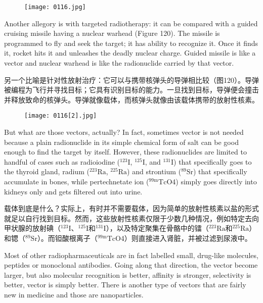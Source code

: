 \documentclass[dvipsnames, svgnames,a4paper,11pt]{article}
\begin{document}
\begin{figure}[h]
    \centering
    \texttt{[image: 0116.jpg]}
     \label{fig119}
\end{figure}


Another allegory is with targeted radiotherapy: it can be compared with a guided
cruising missile having a nuclear warhead (Figure 120). The missile is programmed
to fly and seek the target; it has ability to recognize it. Once it finds it, rocket hits it
and unleashes the deadly nuclear charge. Guided missile is like a vector and nuclear
warhead is like the radionuclide carried by that vector.

另一个比喻是针对性放射治疗：它可以与携带核弹头的导弹相比较（图120）。导弹被编程为飞行并寻找目标；它具有识别目标的能力。一旦找到目标，导弹便会撞击并释放致命的核弹头。导弹就像载体，而核弹头就像由该载体携带的放射性核素。

\begin{figure}[h]
    \centering
    \texttt{[image: 0116[2].jpg]}
     \label{fig120}
\end{figure}

But what are those vectors, actually? In fact, sometimes vector is not needed
because a plain radionuclide in its simple chemical form of salt can be good enough
to find the target by itself. However, these radionuclides are limited to handful of
cases such as radioiodine (${}^{123}\mathrm{I}$, ${}^{125}\mathrm{I}$, and ${}^{131}\mathrm{I}$) that specifically goes to the thyroid
gland, radium (${}^{223}\mathrm{Ra}$, ${}^{225}\mathrm{Ra}$) and strontium (${}^{89}\mathrm{Sr}$) that specifically accumulate in
bones, while pertechnetate ion (${}^\mathrm{99m}\mathrm{Tc}$O4) simply goes directly into kidneys only and
gets filtered out into urine.

载体到底是什么？实际上，有时并不需要载体，因为简单的放射性核素以盐的形式就足以自行找到目标。然而，这些放射性核素仅限于少数几种情况，例如特定去向甲状腺的放射碘（${}^{123}\mathrm{I}$、${}^{125}\mathrm{I}$和${}^{131}\mathrm{I}$），以及特定聚集在骨骼中的镭（${}^{223}\mathrm{Ra}$和${}^{225}\mathrm{Ra}$）和锶（${}^{89}\mathrm{Sr}$）。而钽酸根离子（${}^\mathrm{99m}\mathrm{Tc}$O4）则直接进入肾脏，并被过滤到尿液中。

Most of other radiopharmaceuticals are in fact labelled small, drug-like molecules,
peptides or monoclonal antibodies. Going along that direction, the vector become
larger, but also molecular recognition is better, affinity is stronger, selectivity is better,
vector is simply better. There is another type of vectors that are fairly new in
medicine and those are nanoparticles.
\end{document}
